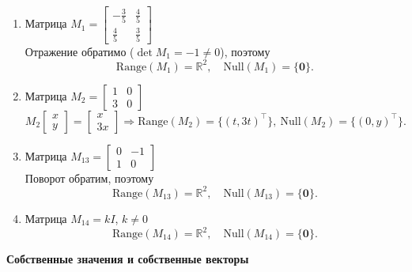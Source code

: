 \begin{enumerate}
  \item Матрица $M_1 = 
  \begin{bmatrix}
    -\tfrac{3}{5} & \tfrac{4}{5} \\
    \tfrac{4}{5} & \tfrac{3}{5}
  \end{bmatrix}$\\
  Отражение обратимо ($\det M_1=-1\ne0$), поэтому
  \[
    \mathrm{Range}(M_1) = \mathbb{R}^2,\quad \mathrm{Null}(M_1)=\{\mathbf{0}\}.
  \]

  \item Матрица $M_2 = 
  \begin{bmatrix}
    1 & 0 \\
    3 & 0
  \end{bmatrix}$\\
  \[
    M_2 \begin{bmatrix} x \\ y \end{bmatrix} = \begin{bmatrix} x \\ 3x \end{bmatrix}
    \Rightarrow \mathrm{Range}(M_2)=\{(t,3t)^\top\},\ \mathrm{Null}(M_2)=\{(0,y)^\top\}.
  \]

  \item Матрица $M_{13} = 
  \begin{bmatrix}
    0 & -1 \\
    1 & 0
  \end{bmatrix}$\\
  Поворот обратим, поэтому 
  \[
    \mathrm{Range}(M_{13})=\mathbb{R}^2,\quad \mathrm{Null}(M_{13})=\{\mathbf{0}\}.
  \]

  \item Матрица $M_{14} = k I$, $k\ne0$\\
  \[
    \mathrm{Range}(M_{14})=\mathbb{R}^2,\quad \mathrm{Null}(M_{14})=\{\mathbf{0}\}.
  \]
\end{enumerate}


\textbf{Собственные значения и собственные векторы}

